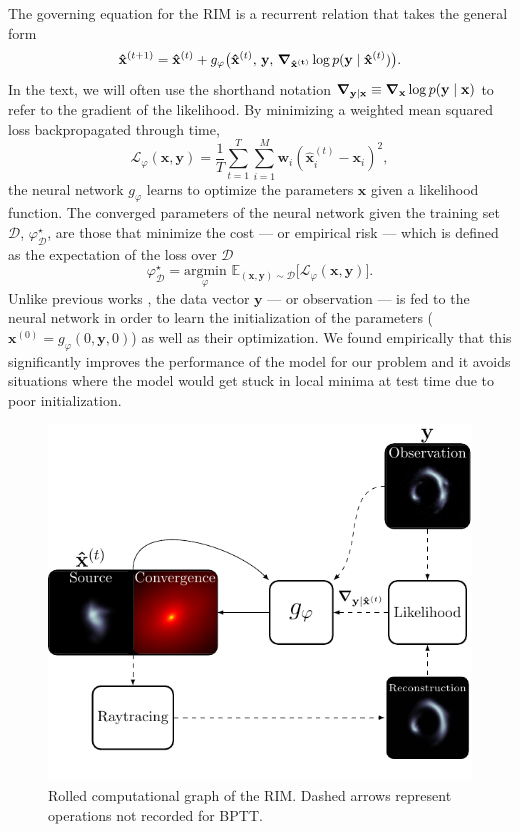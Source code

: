 The governing equation for the RIM is a recurrent 
relation that takes the general form
\begin{equation}\label{eq:RIM}
        \mathbf{\hat{x}}^{(t+1)} = \mathbf{\hat{x}}^{(t)} 
        + g_\varphi \big(\mathbf{\hat{x}}^{(t)},\, \mathbf{y},\, 
\grad_{\mathbf{\hat{x}^{(t)}}} \log p(\mathbf{y} \mid \mathbf{\hat{x}}^{(t)})\big).
\end{equation}
In the text, we will often use the shorthand notation ${\grad_{\mathbf{y} \mid \mathbf{x}} \equiv 
\grad_{\mathbf{x}} \log p(\mathbf{y} \mid \mathbf{x})}$
to refer to the gradient of the likelihood.
By minimizing a weighted mean squared loss backpropagated 
through time, 
\begin{equation}\label{eq:Loss}
		\mathcal{L}_\varphi(\mathbf{x}, \mathbf{y}) = 
		\frac{1}{T}\sum_{t=1}^{T}\sum_{i=1}^{M} \mathbf{w}_i (\mathbf{\hat{x}}^{(t)}_i - \mathbf{x}_i)^2,
\end{equation} 
the neural network $g_\varphi$ learns to optimize the 
parameters $\mathbf{x}$ given a likelihood function. 
The converged parameters of the neural network given the training set $\mathcal{D}$, 
$\varphi^{\star}_{\mathcal{D}}$, are those that minimize the cost --- or empirical risk --- 
which is defined as the 
expectation of the loss over $\mathcal{D}$
\begin{equation}\label{eq:Cost} 
		\varphi^{\star}_{\mathcal{D}} = \underset{\varphi}{\text{argmin}}\,\,
		\mathbb{E}_{(\mathbf{x},\mathbf{y}) \sim \mathcal{D}}\big[
		\mathcal{L}_\varphi(\mathbf{x}, \mathbf{y}) \big].
\end{equation} 
Unlike previous works 
\citep{Andrychowicz2016,Putzky2017,Morningstar2018,Morningstar2019,Lonning2019}, 
the data vector $\mathbf{y}$ --- or observation --- 
is fed to the neural network in order to learn 
the initialization of the parameters ($\mathbf{x}^{(0)} = g_\varphi(0, \mathbf{y}, 0)$) 
as well as their optimization. 
We found empirically that this significantly improves the performance 
of the model for our problem and it avoids situations where 
the model would get stuck in local minima at 
test time due to poor initialization. 
\begin{figure}[t!]
        \centering
		\includegraphics[width=0.6\linewidth]{figures/schematic_rim}
        \caption{Rolled computational graph of the RIM. Dashed arrows represent operations not recorded for BPTT.}
        \label{fig:rolled graph}
\end{figure}


